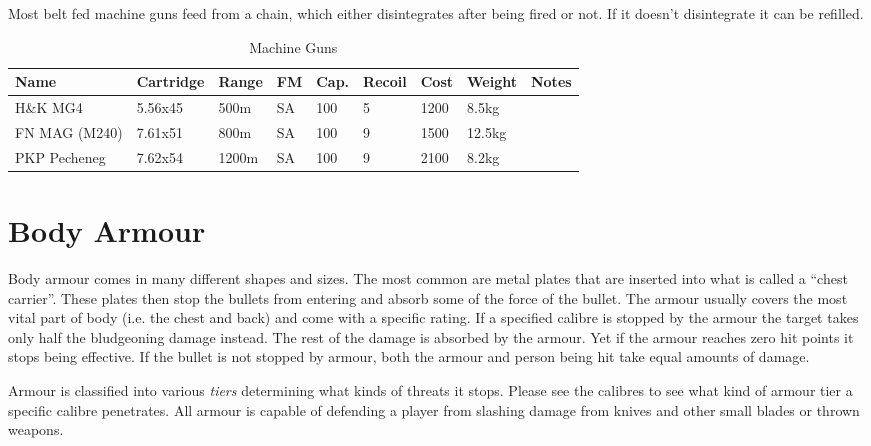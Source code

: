 Most belt fed machine guns feed from a chain, which either disintegrates after
being fired or not. If it doesn't disintegrate it can be refilled.

\begin{table}
  \caption{Machine Guns}
  \label{tab:LMG}
  \begin{center}
    \begin{tabular}{| l | l | l | l | l | l | l | l | l |}
      \hline
      \textbf{Name} & \textbf{Cartridge} & \textbf{Range} &
      \textbf{FM} & \textbf{Cap.} & \textbf{Recoil} &
      \textbf{Cost} & \textbf{Weight} & \textbf{Notes} \\ \hline


      H\&K MG4      & 5.56x45 &  500m & SA & 100 & 5 & 1200 &  8.5kg & \\ \hline
      FN MAG (M240) & 7.61x51 &  800m & SA & 100 & 9 & 1500 & 12.5kg & \\ \hline
      PKP Pecheneg  & 7.62x54 & 1200m & SA & 100 & 9 & 2100 &  8.2kg & \\ \hline

    \end{tabular}
  \end{center}
\end{table}

\section{Body Armour}

Body armour comes in many different shapes and sizes. The most common are metal
plates that are inserted into what is called a ``chest carrier''. These plates
then stop the bullets from entering and absorb some of the force of the bullet.
The armour usually covers the most vital part of body (i.e. the chest and back)
and come with a specific rating. If a specified calibre is stopped by the
armour the target takes only half the bludgeoning damage instead. The rest of
the damage is absorbed by the armour. Yet if the armour reaches zero hit points
it stops being effective. If the bullet is not stopped by armour, both the
armour and person being hit take equal amounts of damage.

Armour is classified into various \emph{tiers} determining what kinds of threats
it stops. Please see the calibres to see what kind of armour tier a specific
calibre penetrates. All armour is capable of defending a player from slashing
damage from knives and other small blades or thrown weapons.

